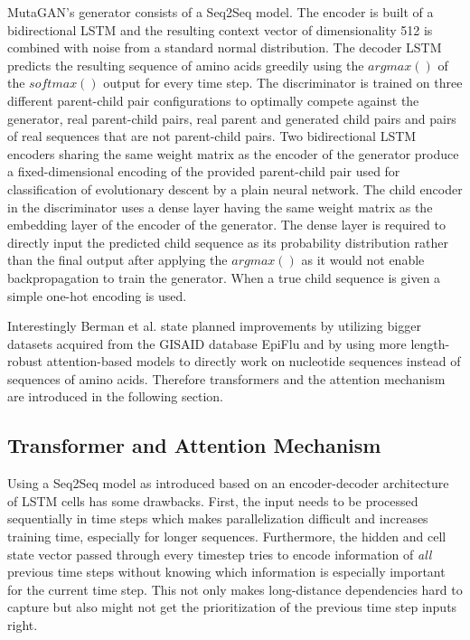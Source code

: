 MutaGAN's generator consists of a \ac{Seq2Seq} model. The encoder is built of a bidirectional \ac{LSTM} and the resulting context vector of dimensionality 512 is combined with noise from a standard normal dis\-tri\-bu\-ti\-on. The decoder \ac{LSTM} predicts the resulting sequence of amino acids greedily using the $argmax()$ of the $softmax()$ output for every time step. The discriminator is trained on three different parent-child pair configurations to optimally compete against the generator, real parent-child pairs, real parent and ge\-ne\-ra\-ted child pairs and pairs of real sequences that are not parent-child pairs. Two bidirectional \ac{LSTM} encoders sharing the same weight matrix as the encoder of the generator produce a fixed-dimensional encoding of the provided parent-child pair used for classification of evolutionary descent by a plain neural network. The child encoder in the discriminator uses a dense layer having the same weight matrix as the embedding layer of the encoder of the generator. The dense layer is required to directly input the predicted child sequence as its probability distribution rather than the final output after applying the $argmax()$ as it would not enable backpropagation to train the generator. When a true child sequence is given a simple one-hot encoding is used. \cite{Berman2020}

Interestingly Berman et al. \cite{Berman2020} state planned improvements by utilizing bigger datasets acquired from the \ac{GISAID} database EpiFlu and by using more length-robust attention-based models to directly work on nucleotide sequences instead of sequences of amino acids. Therefore transformers and the attention mechanism are introduced in the following section.

\subsection{Transformer and Attention Mechanism} \label{fundamentalsH}

Using a \ac{Seq2Seq} model as introduced based on an encoder-decoder ar\-chi\-tec\-tu\-re of \ac{LSTM} cells has some drawbacks. First, the input needs to be processed sequentially in time steps which makes parallelization difficult and increases training time, especially for longer sequences. Fur\-ther\-mo\-re, the hidden and cell state vector passed through every timestep tries to encode information of \textit{all} previous time steps without knowing which information is especially important for the current time step. This not only makes long-distance dependencies hard to capture but also might not get the prioritization of the previous time step inputs right. \cite{Bahdanau2016, Vaswani2017} 

